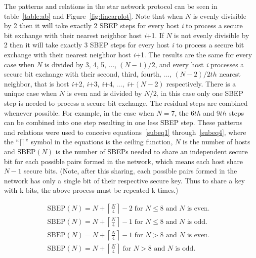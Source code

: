 \documentclass[a4paper,12pt,pdftex]{article}
\begin{document}
The patterns and relations in the star network protocol can be seen in table~\ref{table:ab} and Figure~\ref{fig:linearplot}. Note that when $N$ is evenly divisible by 2 then it will take exactly 2 SBEP steps for every host \textit{i} to process a secure bit exchange with their nearest neighbor host \textit{i}+1. If $N$ is not evenly divisible by 2 then it will take exactly 3 SBEP steps for every host \textit{i} to process a secure bit exchange with their nearest neighbor host \textit{i}+1. The results are the same for every case when $N$ is divided by 3, 4, 5, ..., $(N-1)/2$, and every host \textit{i} processes a secure bit exchange with their second, third, fourth, ..., $(N-2)/2th$ nearest neighbor, that is host \textit{i}+2, \textit{i}+3, \textit{i}+4, ..., \textit{i}+$(N-2)$ respectively. There is a unique case when $N$ is even and is divided by $N/2$, in this case only one SBEP step is needed to process a secure bit exchange. The residual steps are combined whenever possible. For example, in the case when $N=7$, the 6$th$ and 9$th$ steps can be combined into one step resulting in one less SBEP step. These patterns and relations were used to conceive equations~\eqref{subeq1} through~\eqref{subeq4}, where the ``$\lceil{}\rceil$'' symbol in the equations is the ceiling function, $N$ is the number of hosts and $\mathrm{SBEP}(N)$ is the number of SBEPs needed to share an independent secure bit for each possible pairs formed in the network, which means each host share $N-1$ secure bits. (Note, after this sharing, each possible pairs formed in the network has only a single bit of their respective secure key. Thus to share a key with k bits, the above process must be repeated k times.)

\begin{subequations}
 \label{eq1}
 \begin{align}
  \mathrm{SBEP}(N) = N+  \left\lceil{\frac{N}{4}}\right\rceil -2 \mbox{    for } N \leq 8 \mbox{ and } N \mbox{ is even}. \label{subeq1} \\
  \mathrm{SBEP}(N) = N+  \left\lceil{\frac{N}{4}}\right\rceil -1 \mbox{    for } N \leq 8 \mbox{ and } N \mbox{ is odd}. \label{subeq2} \\
  \mathrm{SBEP}(N) = N+  \left\lceil{\frac{N}{4}}\right\rceil -1  \mbox{    for } N > 8 \mbox{ and } N \mbox{ is even}. \label{subeq3} \\
  \mathrm{SBEP}(N) = N+  \left\lceil{\frac{N}{4}}\right\rceil  \mbox{    for } N > 8 \mbox{ and } N \mbox { is odd}. \label{subeq4}
 \end{align}
\end{subequations}
\end{document}

